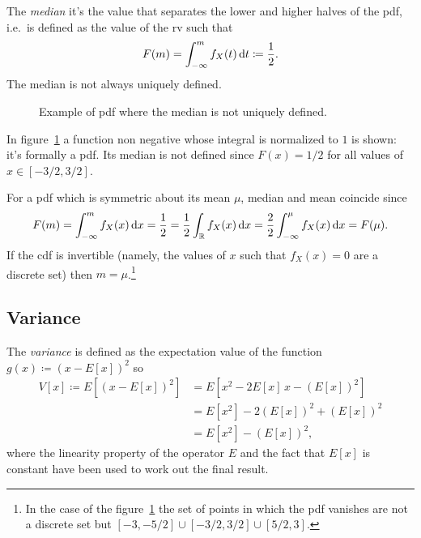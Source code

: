 \documentclass[
	10pt,
	draft
]{scrreprt}
\begin{document}
	The \emph{median} it's the value that separates the lower and higher halves of the \ac{pdf}, i.e.~is defined as the value of the \ac{rv} such that
\begin{equation}
F(m) = \int_{-\infty}^m f_X(t)\mathop{}\!\mathrm{d} t \coloneqq \frac{1}{2}.
\end{equation}
The median is not always uniquely defined.
\begin{figure}
	\centering

\subfloat[][\ac{pdf}.]{%
}


	\caption{Example of \ac{pdf} where the median is not uniquely defined.}
	\label{fig:exampleNotMedian}
\end{figure}
In figure~\ref{fig:exampleNotMedian} a function non negative whose integral is normalized to $1$ is shown: it's formally a \ac{pdf}.
Its median is not defined since $F(x) = 1/2$ for all values of $x\in[-3/2,3/2]$.




For a \ac{pdf} which is symmetric about its mean $\mu$, median and mean coincide since
\begin{equation}
F(m) = \int_{-\infty}^m f_X(x)\mathop{}\!\mathrm{d} x = \frac{1}{2} = \frac{1}{2}\int_{\mathbb{R}} f_X(x)\mathop{}\!\mathrm{d} x = \frac{2}{2}\int_{-\infty}^\mu f_X(x)\mathop{}\!\mathrm{d} x = F(\mu).
\end{equation}
If the \ac{cdf} is invertible (namely, the values of $x$ such that $f_X(x) = 0$ are a discrete set) then $m=\mu$.\footnote{In the case of the figure~\ref{fig:exampleNotMedian} the set of points in which the \ac{pdf} vanishes are not a discrete set but $[-3,-5/2]\cup[-3/2,3/2]\cup[5/2,3]$.}


			\subsection{Variance}

The \emph{variance} is defined as the expectation value of the function $g(x) \coloneqq (x-E[x])^2$ so
\begin{equation}
\begin{aligned}
V[x] \coloneqq E[(x-E[x])^2] &= E[x^2 - 2E[x]\,x - (E[x])^2 ] \\
&= E[x^2] - 2(E[x])^2 + (E[x])^2\\
&= E[x^2] - (E[x])^2,
\end{aligned}
\end{equation}
where the linearity property of the operator $E$ and the fact that $E[x]$ is constant have been used to work out the final result.
\end{document}
